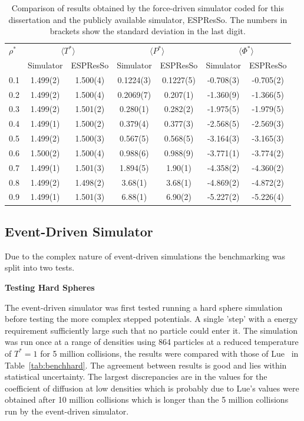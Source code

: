\documentclass[12pt]{UoAthesis} \usepackage{booktabs}
\begin{document}
\begin{table}[htp]
  \caption[Force-driven simulator benchmarking results]
  {Comparison of results obtained by the force-driven simulator 
    coded for this dissertation and the publicly available simulator, 
    ESPResSo. The numbers in brackets show the standard deviation in 
    the last digit.}
  \label{tab:MDvsEsp}
  \begin{tabular} {l c c c c c c}
    \toprule
    $\rho^*$ & \multicolumn{2}{c}{$\langle T^*\rangle$} 
    & \multicolumn{2}{c}{$\langle P^*\rangle$} 
    & \multicolumn{2}{c}{$\langle\Phi^*\rangle$} \\
    \cmidrule(rl{0.75em}){2-3} 
    \cmidrule(rl{0.75em}){4-5}
    \cmidrule(rl{0.75em}){6-7}
    & Simulator & ESPResSo & Simulator & ESPResSo & Simulator & ESPResSo \\
    \midrule
    0.1 & 1.499(2) & 1.500(4) & 0.1224(3) & 0.1227(5) & -0.708(3)  & -0.705(2)\\
    0.2 & 1.499(2) & 1.500(4) & 0.2069(7) & 0.207(1)  & -1.360(9) & -1.366(5)\\
    0.3 & 1.499(2) & 1.501(2) & 0.280(1)  & 0.282(2)  & -1.975(5) & -1.979(5)\\
    0.4 & 1.499(1) & 1.500(2) & 0.379(4)  & 0.377(3)  & -2.568(5) & -2.569(3)\\
    0.5 & 1.499(2) & 1.500(3) & 0.567(5)  & 0.568(5)  & -3.164(3) & -3.165(3)\\
    0.6 & 1.500(2) & 1.500(4) & 0.988(6)  & 0.988(9)  & -3.771(1) & -3.774(2)\\
    0.7 & 1.499(1) & 1.501(3) & 1.894(5)  & 1.90(1)   & -4.358(2) & -4.360(2)\\
    0.8 & 1.499(2) & 1.498(2) & 3.68(1)   & 3.68(1)   & -4.869(2) & -4.872(2)\\
    0.9 & 1.499(1) & 1.501(3) & 6.88(1)   & 6.90(2)   & -5.227(2) & -5.226(4)\\
    \bottomrule
  \end{tabular}
\end{table}
\subsection{Event-Driven Simulator}

Due to the complex nature of event-driven simulations the benchmarking
was split into two tests.
\begin{flushleft}
\textbf{Testing Hard Spheres}
\end{flushleft}
The event-driven simulator was first tested running a hard sphere
simulation before testing the more complex stepped potentials. A
single 'step' with a energy requirement sufficiently large such that
no particle could enter it. The simulation was run once at a range of
densities using 864 particles at a reduced temperature of $T^*=1$ for
5 million collisions, the results were compared with those of
Lue~\cite{Lue2005} in Table~\ref{tab:benchhard}. The agreement between
results is good and lies within statistical uncertainty. The largest
discrepancies are in the values for the coefficient of diffusion at
low densities which is probably due to Lue's values were obtained
after 10 million collisions which is longer than the 5 million
collisions run by the event-driven simulator.
\end{document}
